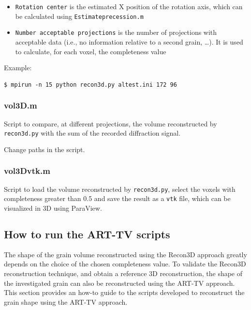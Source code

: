 \documentclass[11pt]{scrartcl}
\begin{document}
\begin{itemize}
    \item {\texttt{Rotation center}} is the estimated {\footnotesize{X}} position of the rotation axis, which can be calculated using {\texttt{Estimate\textunderscore precession.m}}
    \item {\texttt{Number acceptable projections}} is the number of projections with acceptable data (i.e., no information relative to a second grain, \ldots). It is used to calculate, for each voxel, the completeness value
\end{itemize}

Example:

{\texttt{\$ mpirun -n 15 python recon3d.py al\textunderscore test.ini 172 96}}
\subsubsection{vol3D.m}

Script to compare, at different projections, the volume reconstructed by {\texttt{recon3d.py}} with the sum of the recorded diffraction signal.

\danger Change paths in the script.

\subsubsection{vol3D\textunderscore vtk.m}

Script to load the volume reconstructed by {\texttt{recon3d.py}}, select the voxels with completeness greater than 0.5 and save the result as a {\texttt{vtk}} file, which can be visualized in {\footnotesize{3D}} using ParaView.

\subsection{How to run the ART-TV scripts}

The shape of the grain volume reconstructed using the Recon3D approach greatly depends on the choice of the chosen completeness value. To validate the Recon3D reconstruction technique, and obtain a reference {\footnotesize{3D}} reconstruction, the shape of the investigated grain can also be reconstructed using the {\footnotesize{ART-TV}} approach. This section provides an how-to guide to the scripts developed to reconstruct the grain shape using the {\footnotesize{ART-TV}} approach.
\end{document}
